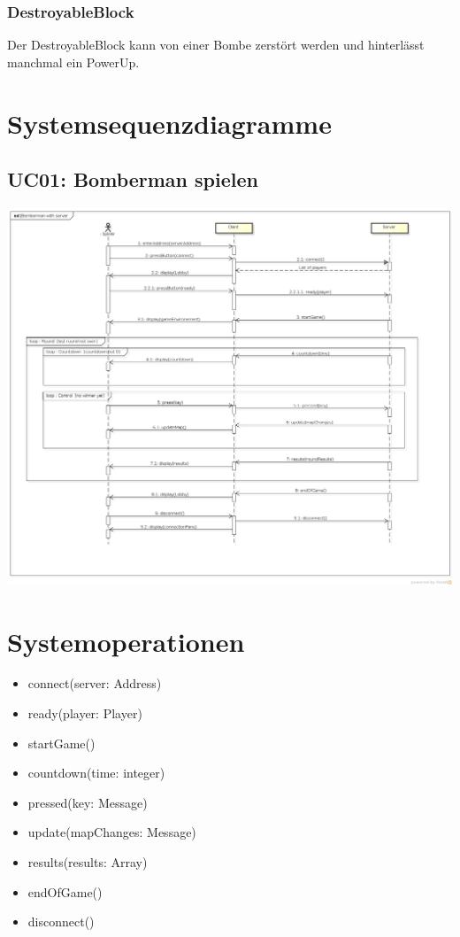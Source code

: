 \documentclass[11pt]{scrartcl}
\begin{document}
\subsubsection{DestroyableBlock}
\label{sec:DestroyableBlock}
Der DestroyableBlock kann von einer Bombe zerstört werden und hinterlässt manchmal ein PowerUp.


\section{Systemsequenzdiagramme}
\label{sec:Systemsequenzdiagramme}
\subsection{UC01: Bomberman spielen}
\label{sec:UC01: Bomberman spielen}
\begin{center}
\includegraphics[scale=0.3]{SystemSequenzDiagramm_JBomberman} 
\end{center}

\newpage
\section{Systemoperationen}
\label{sec:Systemoperationen}
\begin{itemize}
\item connect(server: Address)
\item ready(player: Player)
\item startGame()
\item countdown(time: integer)
\item pressed(key: Message)
\item update(mapChanges: Message)
\item results(results: Array)
\item endOfGame()
\item disconnect()
\end{itemize}
\end{document}

